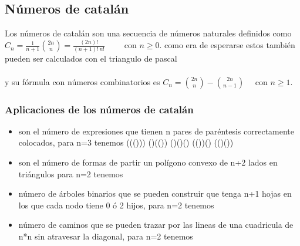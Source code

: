 \subsection{Números de catalán}
Los números de catalán son una secuencia de números naturales definidos como
\\$C_{n}={\frac {1}{n+1}}{2n \choose n}={\frac {(2n)!}{(n+1)!\,n!}}\qquad {\mbox{ con }}n\geq 0.$
como era de esperarse estos también pueden ser  calculados con el triangulo de pascal
\\
\\y su fórmula con números combinatorios es $C_{n}={2n \choose n}-{2n \choose n-1}\quad {\mbox{ con }}n\geq 1.$
\subsubsection{Aplicaciones de los números de catalán}
\begin{itemize}
  \item son el número de expresiones que tienen n pares de paréntesis correctamente colocados, para n=3 tenemos ((()))	()(())	()()()	(())()	(()())
  \item son el número de formas de  partir un polígono convexo de n+2 lados en triángulos para n=2 tenemos
  \\
  \item número de árboles binarios que se pueden construir que tenga n+1 hojas en los que cada nodo tiene 0 ó 2 hijos, para n=2 tenemos
  \\
  \item número de caminos que se pueden trazar por las lineas de una cuadricula de n*n sin atravesar la diagonal, para n=2 tenemos
  \\
\end{itemize}

